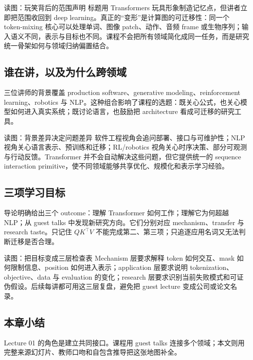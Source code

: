 \begin{knowledgebox}{读图：玩笑背后的范围声明}
标题用 Transformers 玩具形象制造记忆点，但讲者立即把范围收回到 deep learning。真正的“变形”是计算图的可迁移性：同一个 token-mixing 核心可以处理单词、图像 patch、动作、音频 frame 或生物序列；输入语义不同，表示与目标也不同。课程不会把所有领域简化成同一任务，而是研究统一骨架如何与领域归纳偏置结合。
\end{knowledgebox}


\subsection{谁在讲，以及为什么跨领域}

三位讲师的背景覆盖 production software、generative modeling、reinforcement learning、robotics 与 NLP。这种组合影响了课程的选题：既关心公式，也关心模型如何进入真实系统；既讨论语言，也鼓励把 architecture 看成可迁移的研究工具。


\begin{knowledgebox}{读图：背景差异决定问题差异}
软件工程视角会追问部署、接口与可维护性；NLP 视角关心语言表示、预训练和迁移；RL/robotics 视角关心时序决策、部分可观测与行动反馈。Transformer 并不会自动解决这些问题，但它提供统一的 sequence interaction primitive，使不同领域能够共享优化、规模化和表示学习经验。
\end{knowledgebox}

\subsection{三项学习目标}

导论明确给出三个 outcome：理解 Transformer 如何工作；理解它为何超越 NLP；从 guest talks 中发现新研究方向。它们分别对应 mechanism、transfer 与 research taste。只记住 $QK^\top V$ 不能完成第二、第三项；只追逐应用名词又无法判断迁移是否合理。


\begin{knowledgebox}{读图：把目标变成三层检查表}
Mechanism 层要求解释 token 如何交互、mask 如何限制信息、position 如何进入表示；application 层要求说明 tokenization、objective、data 与 evaluation 的变化；research 层要求识别当前失败模式和可证伪假设。后续每讲都可用这三层复盘，避免把 guest lecture 变成公司或论文名录。
\end{knowledgebox}

\subsection{本章小结}

Lecture 01 的角色是建立共同接口。课程用 guest talks 连接多个领域；本文则用完整来源幻灯片、教师口吻和自包含推导把这张地图补全。

